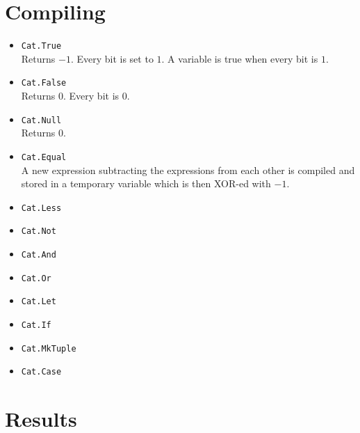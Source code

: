 \documentclass{article}
\begin{document}
\section{Compiling}
\begin{itemize}
	\item {\tt Cat.True } \\
	Returns $-1$. Every bit is set to $1$. A variable is true when every bit is $1$.
	\item {\tt Cat.False } \\
	Returns $0$. Every bit is $0$. 
	\item {\tt Cat.Null } \\
	Returns $0$.
	\item {\tt Cat.Equal } \\
	A new expression subtracting the expressions from each other is compiled and stored in a temporary variable which is then XOR-ed with $-1$.
	\item {\tt Cat.Less } \\
	
	\item {\tt Cat.Not } \\
	\item {\tt Cat.And } \\
	\item {\tt Cat.Or } \\
	\item {\tt Cat.Let } \\
	\item {\tt Cat.If } \\
	\item {\tt Cat.MkTuple } \\
	\item {\tt Cat.Case } \\
\end{itemize}

\section{Results}

\end{document}
